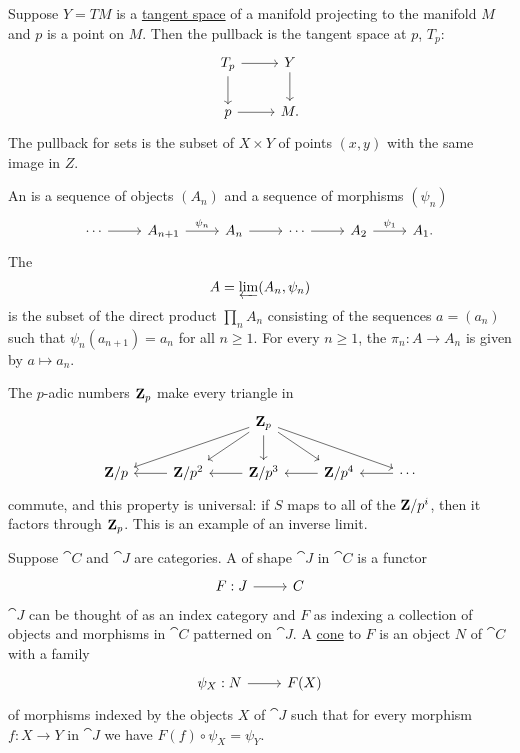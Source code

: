 \documentclass[11pt, oneside]{article}
\begin{document}
Suppose $Y=TM$ is a \href{https://en.wikipedia.org/wiki/Tangent_space}{\color{black}tangent space} of a manifold projecting to the manifold $M$ and $p$ is a point on $M$. Then the pullback is the tangent space at $p$, $T_p$:
\[
\begin{tikzcd}
T_p \arrow[r] \arrow[d]& Y \arrow[d]\\
p\arrow[r]&M.
\end{tikzcd}
\]
The pullback for sets is the subset of $X\times Y$ of points $(x,y)$ with the same image in $Z$.

An  is a sequence of objects $(A_n)$ and a sequence of morphisms $(\psi_n)$ 
\[
\begin{tikzcd}
\cdots \arrow[r]  & A_{n+1}\arrow[r, "\psi_n"] & A_n \arrow[r] &\cdots \arrow[r]  & A_2 \arrow[r, "\psi_1"] & A_1.
\end{tikzcd}
\]
The \href{https://en.wikipedia.org/wiki/Inverse_limit}{} 
\[
A = \varprojlim (A_n, \psi_n)
\]
is the subset of the direct product $\prod_n A_n$ consisting of the sequences $a=(a_n)$ such that $\psi_n(a_{n+1}) = a_n$ for all $n\ge 1$. For every $n\ge 1$, the  $\pi_n : A \longrightarrow A_n$ is given by $a \longmapsto a_n$.

The $p$-adic numbers $\mathbf Z_p$ make every triangle in 
\[
\begin{tikzcd}
&&\Z_p \arrow[dll]\arrow[dl] \arrow[d]\arrow[dr] \arrow[drr] &&\\
\Z/p & \Z/p^2 \arrow[l] & \Z/p^3 \arrow[l] & \Z/p^4\arrow[l]  & \cdots \arrow[l]
\end{tikzcd}
\]
commute, and this property is universal: if $S$ maps to all of the $\mathbf Z/p^i$, then it factors through $\mathbf Z_p$. This is an example of an inverse limit.

Suppose $\cat C$ and $\cat J$ are categories. A \href{https://en.wikipedia.org/wiki/Diagram_(category_theory)}{} of shape $\cat J$ in $\cat C$ is a functor 
\[
\begin{tikzcd}
F:\cat J \ar[r]& \cat C
\end{tikzcd}
\]
$\cat J$ can be thought of as an index category and $F$ as indexing a collection of objects and morphisms in $\cat C$ patterned on $\cat J$. A \href{https://en.wikipedia.org/wiki/Cone_(category_theory)}{\color{black}cone} to $F$ is an object $N$ of $\cat C$ with a family
\[
\begin{tikzcd}
\psi_X : N\ar[r] & F(X)
\end{tikzcd}
\]
of morphisms indexed by the objects $X$ of $\cat J$ such that for every morphism $f:X\longrightarrow Y$ in $\cat J$ we have $F(f) \circ \psi_X = \psi_Y$.
\end{document}

